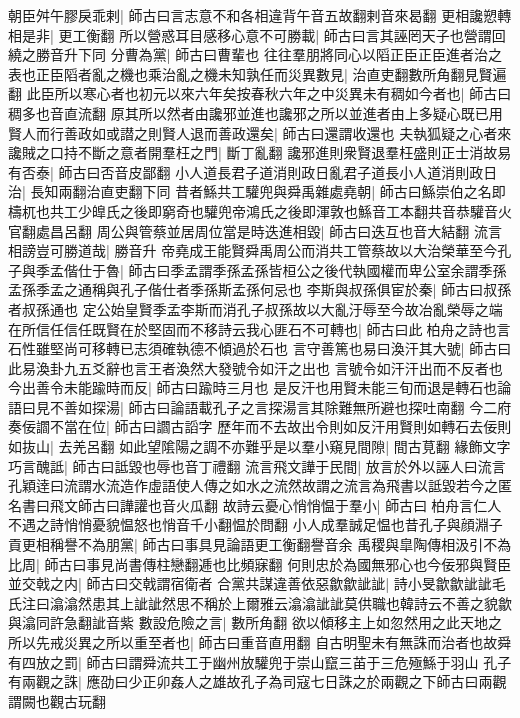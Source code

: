 朝臣舛午膠戾乖剌|{
	師古曰言志意不和各相違背午音五故翻剌音來曷翻}
更相讒愬轉相是非|{
	更工衡翻}
所以營惑耳目感移心意不可勝載|{
	師古曰言其誣罔天子也營謂回繞之勝音升下同}
分曹為黨|{
	師古曰曹輩也}
往往羣朋將同心以䧟正臣正臣進者治之表也正臣䧟者亂之機也乘治亂之機未知孰任而災異數見|{
	治直吏翻數所角翻見賢遍翻}
此臣所以寒心者也初元以來六年矣按春秋六年之中災異未有稠如今者也|{
	師古曰稠多也音直流翻}
原其所以然者由讒邪並進也讒邪之所以並進者由上多疑心既已用賢人而行善政如或譛之則賢人退而善政還矣|{
	師古曰還謂收還也}
夫執狐疑之心者來讒賊之口持不斷之意者開羣枉之門|{
	斷丁亂翻}
讒邪進則衆賢退羣枉盛則正士消故易有否泰|{
	師古曰否音皮鄙翻}
小人道長君子道消則政日亂君子道長小人道消則政日治|{
	長知兩翻治直吏翻下同}
昔者鯀共工驩兜與舜禹雜處堯朝|{
	師古曰鯀崇伯之名即檮杌也共工少皥氏之後即窮奇也驩兜帝鴻氏之後即渾敦也鯀音工本翻共音恭驩音火官翻處昌呂翻}
周公與管蔡並居周位當是時迭進相毀|{
	師古曰迭互也音大結翻}
流言相謗豈可勝道哉|{
	勝音升}
帝堯成王能賢舜禹周公而消共工管蔡故以大治榮華至今孔子與季孟偕仕于魯|{
	師古曰季孟謂季孫孟孫皆桓公之後代執國權而卑公室余謂季孫孟孫季孟之通稱與孔子偕仕者季孫斯孟孫何忌也}
李斯與叔孫俱宦於秦|{
	師古曰叔孫者叔孫通也}
定公始皇賢季孟李斯而消孔子叔孫故以大亂汙辱至今故冶亂榮辱之端在所信任信任既賢在於堅固而不移詩云我心匪石不可轉也|{
	師古曰此柏舟之詩也言石性雖堅尚可移轉已志須確執德不傾過於石也}
言守善篤也易曰渙汗其大號|{
	師古曰此易渙卦九五爻辭也言王者渙然大發號令如汗之出也}
言號令如汗汗出而不反者也今出善令未能踰時而反|{
	師古曰踰時三月也}
是反汗也用賢未能三旬而退是轉石也論語曰見不善如探湯|{
	師古曰論語載孔子之言探湯言其除難無所避也探吐南翻}
今二府奏佞讇不當在位|{
	師古曰讇古謟字}
歷年而不去故出令則如反汗用賢則如轉石去佞則如抜山|{
	去羌呂翻}
如此望隂陽之調不亦難乎是以羣小窺見間隙|{
	間古莧翻}
緣飾文字巧言醜詆|{
	師古曰詆毀也辱也音丁禮翻}
流言飛文譁于民間|{
	放言於外以誣人曰流言孔穎逹曰流謂水流造作虛語使人傳之如水之流然故謂之流言為飛書以詆毀若今之匿名書曰飛文師古曰譁讙也音火瓜翻}
故詩云憂心悄悄愠于羣小|{
	師古曰柏舟言仁人不遇之詩悄悄憂貌愠怒也悄音千小翻愠於問翻}
小人成羣誠足愠也昔孔子與顔淵子貢更相稱譽不為朋黨|{
	師古曰事具見論語更工衡翻譽音余}
禹稷與皐陶傳相汲引不為比周|{
	師古曰事見尚書傳柱戀翻逓也比頻寐翻}
何則忠於為國無邪心也今佞邪與賢臣並交戟之内|{
	師古曰交戟謂宿衛者}
合黨共謀違善依惡歙歙訿訿|{
	詩小旻歙歙訿訿毛氏注曰潝潝然患其上訿訿然思不稱於上爾雅云潝潝訿訿莫供職也韓詩云不善之貌歙與潝同許急翻訿音紫}
數設危險之言|{
	數所角翻}
欲以傾移主上如忽然用之此天地之所以先戒災異之所以重至者也|{
	師古曰重音直用翻}
自古明聖未有無誅而治者也故舜有四放之罰|{
	師古曰謂舜流共工于幽州放驩兜于崇山竄三苖于三危殛鯀于羽山}
孔子有兩觀之誅|{
	應劭曰少正卯姦人之雄故孔子為司寇七日誅之於兩觀之下師古曰兩觀謂闕也觀古玩翻}
